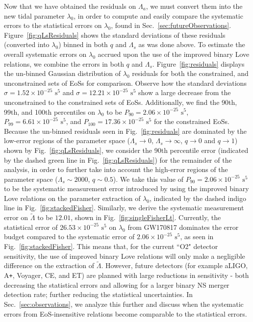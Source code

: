 \documentclass[prd,twocolumn,nofootinbib,superscriptaddress,amsmath,amssymb]{revtex4-1}
\begin{document}
Now that we have obtained the residuals on $\Lambda_a$, we must convert them into the new tidal parameter $\lambda_0$, in order to compute and easily compare the systematic errors to the statistical errors on $\lambda_0$, found in Sec.~\ref{sec:futureObservations}.
Figure~\ref{fig:qLsResiduals} shows the standard deviations of these residuals (converted into $\lambda_0$) binned in both $q$ and $\Lambda_s$ as was done above. 
To estimate the overall systematic errors on $\lambda_0$ accrued upon the use of the improved binary Love relations, we combine the errors in both $q$ and $\Lambda_s$.
Figure~\ref{fig:residuals} displays the un-binned Gaussian distribution of $\lambda_0$ residuals for both the constrained, and unconstrained sets of EoSs for comparison.
Observe how the standard deviations $\sigma=1.52\times10^{-25} \text{ s}^5$ and $\sigma=12.21\times10^{-25} \text{ s}^5$ show a large decrease from the unconstrained to the constrained sets of EoSs.
Additionally, we find the 90th, 99th, and 100th percentiles on $\lambda_0$ to be $P_{90}=2.06\times10^{-25} \text{ s}^5$, $P_{99}=6.61\times10^{-25} \text{ s}^5$, and $P_{100}=17.36\times10^{-25} \text{ s}^5$ for the constrained EoSs.
Because the un-binned residuals seen in Fig.~\ref{fig:residuals} are dominated by the low-error regions of the parameter space ($\Lambda_s \rightarrow 0$, $\Lambda_s \rightarrow \infty$, $q \rightarrow 0$ and $q \rightarrow 1$) shown by Fig.~\ref{fig:qLsResiduals}, we consider the 90th percentile error (indicated by the dashed green line in Fig.~\ref{fig:qLsResiduals}) for the remainder of the analysis, in order to further take into account the high-error regions of the parameter space ($\Lambda_s \sim 2000$, $q\sim0.5$).
We take this value of $P_{90}=2.06\times10^{-25} \text{ s}^5$ to be the systematic measurement error introduced by using the improved binary Love relations on the parameter extraction of $\lambda_0$, indicated by the dashed indigo line in Fig.~\ref{fig:stackedFisher}.
Similarly, we derive the systematic measurement error on $\tilde\Lambda$ to be $12.01$, shown in Fig.~\ref{fig:singleFisherLt}.
Currently, the statistical error of $26.53 \times 10^{-25} \text{ s}^5$ on $\lambda_0$ from GW170817 dominates the error budget compared to the systematic error of $2.06\times10^{-25} \text{ s}^5$, as seen in Fig.~\ref{fig:stackedFisher}.
This means that, for the current ``O2" detector sensitivity, the use of improved binary Love relations will only make a negligible difference on the extraction of $\tilde\Lambda$.
However, future detectors (for example aLIGO, A\texttt{+}, Voyager, CE, and ET) are planned with large reductions in sensitivity - both decreasing the statistical errors and allowing for a larger binary NS merger detection rate; further reducing the statistical uncertainties.
In Sec.~\ref{sec:observations}, we analyze this further and discuss when the systematic errors from EoS-insensitive relations become comparable to the statistical errors.
\end{document}
